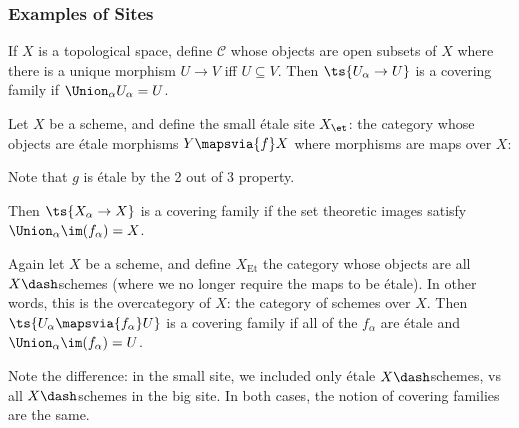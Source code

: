 \hypertarget{examples-of-sites}{%
\subsubsection{Examples of Sites}\label{examples-of-sites}}

\begin{example}

If \(X\) is a topological space, define \(\mathcal{C}\) whose objects
are open subsets of \(X\) where there is a unique morphism \(U\to V\)
iff \(U\subseteq V\). Then \(\ts{U_\alpha \to U}\) is a covering family
if \(\Union_\alpha U_\alpha = U\).

\end{example}

\begin{example}

Let \(X\) be a scheme, and define the small étale site \(X_{\et}\): the
category whose objects are étale morphisms \(Y\mapsvia{f} X\) where
morphisms are maps over \(X\):

\begin{center}
\end{center}

Note that \(g\) is étale by the 2 out of 3 property.

Then \(\ts{X_\alpha\to X}\) is a covering family if the set theoretic
images satisfy \(\Union_\alpha \im(f_\alpha) = X\).

\end{example}

\begin{example}

Again let \(X\) be a scheme, and define \(X_{\mathrm{Et}}\) the category
whose objects are all \(X\dash\)schemes (where we no longer require the
maps to be étale). In other words, this is the overcategory of \(X\):
the category of schemes over \(X\). Then
\(\ts{U_\alpha\mapsvia{f_\alpha}U}\) is a covering family if all of the
\(f_\alpha\) are étale and \(\Union_\alpha \im(f_\alpha) = U\).

\end{example}

Note the difference: in the small site, we included only étale
\(X\dash\)schemes, vs all \(X\dash\)schemes in the big site. In both
cases, the notion of covering families are the same.

